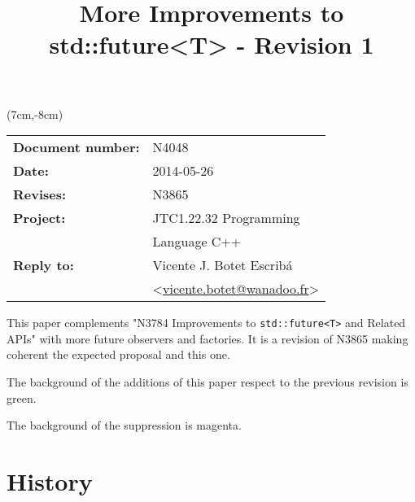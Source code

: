 \documentclass[a4paper,10pt]{article}
\title{More Improvements to std::future<T> - Revision 1}
\author{}
\date{}
\newcommand{\cpp}[1]{\lstinline{#1}}
\begin{document}
\maketitle
\begin{textblock*}{9cm}(7cm,-8cm)
\begin{tabular}{l l}
\textbf{Document number:} & N4048 \\
\textbf{Date:}  & 2014-05-26 \\
\textbf{Revises:} & N3865 \\
\textbf{Project:} & JTC1.22.32 Programming \\
 & Language C++ \\
\textbf{Reply to:} & Vicente J. Botet Escrib\'{a} \\
 & <\href{mailto:vicente.botet@wanadoo.fr}{vicente.botet@wanadoo.fr}> 
  
\end{tabular}
\end{textblock*}

\vspace{-6em}
\setcounter{tocdepth}{1}

This paper complements "N3784 Improvements to \cpp{std::future<T>} and Related APIs" \cite{N3784} with more future observers and factories.
It is a revision of N3865 \cite{N3865} making coherent the expected proposal \cite{N4015} and this one.

The background of the additions of this paper respect to the previous revision is green.

The background of the suppression is magenta.

\tableofcontents

\section{History}
\end{document}
